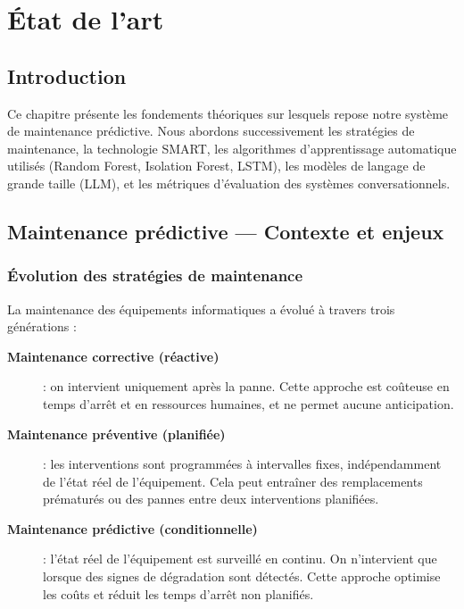 \chapter{État de l'art}

\section{Introduction}

Ce chapitre présente les fondements théoriques sur lesquels repose notre système de
maintenance prédictive. Nous abordons successivement les stratégies de maintenance,
la technologie SMART, les algorithmes d'apprentissage automatique utilisés (Random
Forest, Isolation Forest, LSTM), les modèles de langage de grande taille (LLM), et
les métriques d'évaluation des systèmes conversationnels.

\section{Maintenance prédictive — Contexte et enjeux}

\subsection{Évolution des stratégies de maintenance}

La maintenance des équipements informatiques a évolué à travers trois générations
\cite{mobley2002maintenance} :

\begin{description}
  \item[\textbf{Maintenance corrective (réactive)}] : on intervient uniquement après
  la panne. Cette approche est coûteuse en temps d'arrêt et en ressources humaines,
  et ne permet aucune anticipation.

  \item[\textbf{Maintenance préventive (planifiée)}] : les interventions sont
  programmées à intervalles fixes, indépendamment de l'état réel de l'équipement.
  Cela peut entraîner des remplacements prématurés ou des pannes entre deux
  interventions planifiées.

  \item[\textbf{Maintenance prédictive (conditionnelle)}] : l'état réel de
  l'équipement est surveillé en continu. On n'intervient que lorsque des signes de
  dégradation sont détectés. Cette approche optimise les coûts et réduit les temps
  d'arrêt non planifiés.
\end{description}

